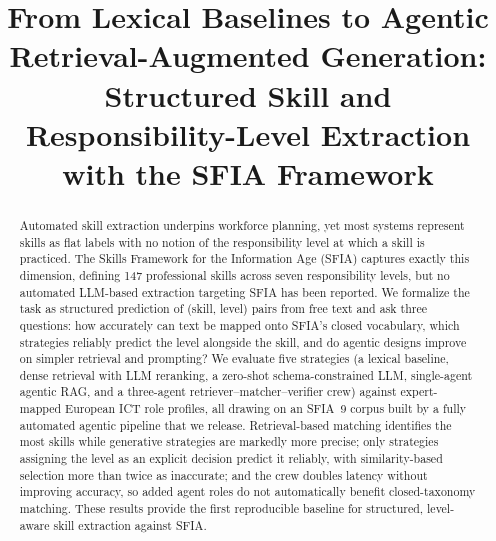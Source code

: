 \documentclass[conference]{IEEEtran}
\begin{document}
\title{From Lexical Baselines to Agentic Retrieval-Augmented Generation: Structured Skill and Responsibility-Level Extraction with the SFIA Framework}

\author{
}

\maketitle


\begin{abstract}
Automated skill extraction underpins workforce planning, yet most systems represent skills as flat labels with no notion of the responsibility level at which a skill is practiced. The Skills Framework for the Information Age (SFIA) captures exactly this dimension, defining 147 professional skills across seven responsibility levels, but no automated LLM-based extraction targeting SFIA has been reported. We formalize the task as structured prediction of (skill, level) pairs from free text and ask three questions: how accurately can text be mapped onto SFIA's closed vocabulary, which strategies reliably predict the level alongside the skill, and do agentic designs improve on simpler retrieval and prompting? We evaluate five strategies (a lexical baseline, dense retrieval with LLM reranking, a zero-shot schema-constrained LLM, single-agent agentic RAG, and a three-agent retriever--matcher--verifier crew) against expert-mapped European ICT role profiles, all drawing on an SFIA~9 corpus built by a fully automated agentic pipeline that we release. Retrieval-based matching identifies the most skills while generative strategies are markedly more precise; only strategies assigning the level as an explicit decision predict it reliably, with similarity-based selection more than twice as inaccurate; and the crew doubles latency without improving accuracy, so added agent roles do not automatically benefit closed-taxonomy matching. These results provide the first reproducible baseline for structured, level-aware skill extraction against SFIA.
\end{abstract}
\end{document}
